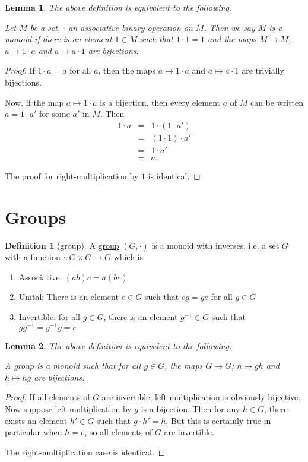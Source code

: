 \documentclass[a4paper]{report}
\newcommand{\defn}[1]{\ul{#1}}
\theoremstyle{definition}
\newtheorem{definition}{Definition}[section]
\theoremstyle{plain}
\newtheorem{lemma}{Lemma}[section]
\theoremstyle{remark}
\begin{document}
\begin{lemma}
  \label{lemma:monoidalmultiplicationbyunitbijective}
  The above definition is equivalent to the following.

  Let $M$ be a set, $\cdot$ an associative binary operation on $M$. Then we say $M$ is a \defn{monoid} if there is an element $1 \in M$ such that $1\cdot 1 = 1$ and the maps $M \to M$, $a \mapsto 1 \cdot a$ and $ a \mapsto a \cdot 1$ are bijections.
\end{lemma}
\begin{proof}
  If $1 \cdot a = a$ for all $a$, then the maps $a \to 1\cdot a$ and $a \mapsto a \cdot 1$ are trivially bijections.

  Now, if the map $a \mapsto 1 \cdot a$ is a bijection, then every element $a$ of $M$ can be written $a = 1 \cdot a'$ for some $a'$ in $M$. Then
  \begin{eqnarray*}
    1 \cdot a &=& 1 \cdot (1 \cdot a') \\
    &=& (1 \cdot 1) \cdot a' \\
    &=& 1 \cdot a' \\
    &=& a.
  \end{eqnarray*}

  The proof for right-multiplication by $1$ is identical.
\end{proof}

\section{Groups}
\begin{definition}[group]
  \label{def:group}
  A \defn{group} $(G, \cdot)$ is a monoid with inverses, i.e. a set $G$ with a function $\cdot\colon G \times G \to G$ which is
  \begin{enumerate}
    \item Associative: $(ab)c = a(bc)$
    \item Unital: There is an element $e \in G$ such that $eg = ge$ for all $g \in G$
    \item Invertible: for all $g \in G$, there is an element $g^{-1} \in G$ such that $gg^{-1} = g^{-1}g = e$
  \end{enumerate}
\end{definition}

\begin{lemma}
  The above definition is equivalent to the following. 

  A group is a monoid such that for all $g \in G$, the maps $G \to G$; $h \mapsto gh$ and $h \mapsto hg$ are bijections.
\end{lemma}
\begin{proof}
  If all elements of $G$ are invertible, left-multiplication is obviously bijective. Now suppose left-multiplication by $g$ is a bijection. Then for any $h \in G$, there exists an element $h' \in G$ such that $g \cdot h' = h$. But this is certainly true in particular when $h = e$, so all elements of $G$ are invertible.

  The right-multiplication case is identical.
\end{proof}
\end{document}
